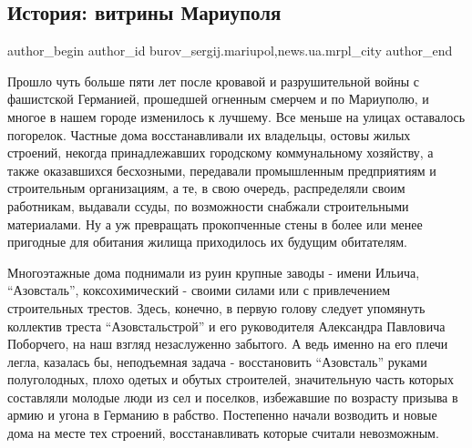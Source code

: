  
 
 
 
 
 
\subsection{История: витрины Мариуполя}
\label{sec:25_06_2017.stz.news.ua.mrpl_city.1.istoria_vitriny_mariupolja}
 
\ifcmt
 author_begin
   author_id burov_sergij.mariupol,news.ua.mrpl_city
 author_end
\fi


Прошло чуть больше пяти лет после кровавой и разрушительной войны с фашистской
Германией, прошедшей огненным смерчем и по Мариуполю, и многое в нашем городе
изменилось к лучшему. Все меньше на улицах оставалось погорелок. Частные дома
восстанавливали их владельцы, остовы жилых строений, некогда принадлежавших
го­родскому коммунальному хозяйству, а также оказавшихся бесхозными, передавали
промышленным предприятиям и строительным организациям, а те, в свою очередь,
распре­деляли своим работникам, выдавали ссуды, по возможности снабжали
строительными материалами. Ну а уж превращать прокопченные стены в более или
менее пригодные для обитания жилища приходилось их будущим обитателям.

Многоэтажные дома поднимали из руин крупные заводы - имени Ильича,
\enquote{Азовсталь}, коксохимический - своими силами или с привлечением строительных
трестов. Здесь, конечно, в первую голову следует упомянуть коллектив треста
\enquote{Азовстальстрой} и его руководителя Александра Павловича Поборчего, на наш
взгляд незаслуженно забытого. А ведь именно на его плечи легла, казалась бы,
неподъемная задача - восстановить \enquote{Азовсталь} руками полуголодных, плохо одетых
и обутых строителей, значительную часть которых составляли молодые люди из сел
и поселков, избежавшие по возрасту призыва в армию и угона в Германию в
рабство. Постепенно начали возводить и новые дома на месте тех строений,
восстанавливать которые считали невозможным.

